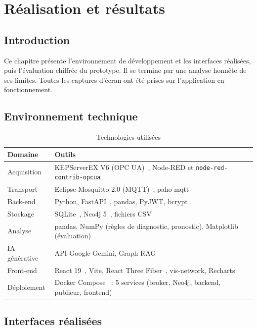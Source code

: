 \chapter{Réalisation et résultats}
\label{chap:realisation}

\section{Introduction}
Ce chapitre présente l'environnement de développement et les interfaces réalisées, puis l'évaluation chiffrée du prototype. Il se termine par une analyse honnête de ses limites. Toutes les captures d'écran ont été prises sur l'application en fonctionnement.

\section{Environnement technique}

\begin{table}[H]
\centering
\caption{Technologies utilisées}
\label{tab:techno}
\begin{tabularx}{\textwidth}{l X}
\toprule
\textbf{Domaine} & \textbf{Outils} \\
\midrule
Acquisition & KEPServerEX V6 (OPC UA)~\cite{kepware}, Node-RED et \texttt{node-red-contrib-opcua}~\cite{nodered} \\
Transport & Eclipse Mosquitto 2.0 (MQTT)~\cite{mqtt5}, paho-mqtt \\
Back-end & Python, FastAPI~\cite{fastapi}, pandas, PyJWT, bcrypt \\
Stockage & SQLite~\cite{sqlite}, Neo4j 5~\cite{neo4j}, fichiers CSV \\
Analyse & pandas, NumPy (règles de diagnostic, pronostic), Matplotlib (évaluation) \\
IA générative & API Google Gemini, Graph RAG~\cite{edge2024} \\
Front-end & React 19~\cite{react}, Vite, React Three Fiber~\cite{r3f}, vis-network, Recharts \\
Déploiement & Docker Compose~\cite{merkel2014} : 5 services (broker, Neo4j, backend, publieur, frontend) \\
\bottomrule
\end{tabularx}
\end{table}

\section{Interfaces réalisées}

